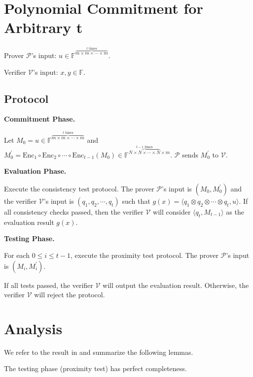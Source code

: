 \section{Polynomial Commitment for Arbitrary t}

Prover $\mathcal{P}$'s input: $u \in \mathbb{F}^{\overbrace{m \times m \times \cdots \times m}^{t \text{ times}}}$.

Verifier $\mathcal{V}$'s input: $x, y \in \mathbb{F}$.

\subsection{Protocol}

\textbf{Commitment Phase.}

Let $M_0 = u \in \mathbb{F}^{\overbrace{m \times m \times \cdots \times m}^{t \text{ times}}}$ and $ M_0^{\prime} = \text{Enc}_1 \circ \text{Enc}_2 \circ \cdots \circ \text{Enc}_{t-1} (M_0) \in \mathbb{F}^{\overbrace{N \times N \times \cdots \times N}^{t-1 \text{ times}} \times m}$. $\mathcal{P}$ sends $M_0^{\prime}$ to $\mathcal{V}$.

\textbf{Evaluation Phase.}

Execute the consistency test protocol. The prover $\mathcal{P}$'s input is $(M_0, M_0^{\prime})$ and the verifier $\mathcal{V}$'s input is $(q_1, q_2, \cdots, q_t)$ such that $g(x) =\langle q_1 \otimes q_2 \otimes \cdots \otimes q_t, u \rangle $.
If all consistency checks passed, then the verifier $\mathcal{V}$ will consider $\langle q_t, M_{t-1} \rangle$ as the evaluation result $g(x)$. 

\textbf{Testing Phase.}

For each $0 \le i \le t-1$, execute the proximity test protocol. The prover $\mathcal{P}$'s input is $(M_i, M_i^{\prime})$.

If all tests passed, the verifier $\mathcal{V}$ will output the evaluation result. Otherwise, the verifier $\mathcal{V}$ will reject the protocol.

\section{Analysis}

We refer to the result in \cite{cryptoeprint:2020/1426} and summarize the following lemmas. 

\begin{lemma}
\label{lemma:pc-completeness}
The testing phase (proximity test) has perfect completeness.
\end{lemma}

